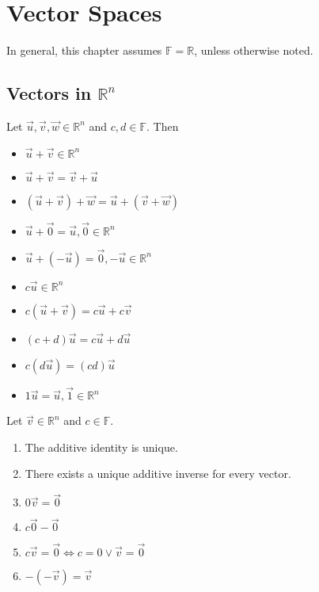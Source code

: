 \chapter{Vector Spaces}
In general, this chapter assumes \(\mathbb{F} =\mathbb{R} \), unless otherwise noted.
\section{Vectors in \(\mathbb{R} ^n\) }
\begin{definition}
    Let \(\vec{u},\vec{v} ,\vec{w}\in\mathbb{R} ^n\) and \(c,d\in\mathbb{F} \). Then 
    \begin{itemize}
        \item \(\vec{u} +\vec{v} \in\mathbb{R} ^n\) 
        \item \(\vec{u} +\vec{v} =\vec{v} +\vec{u} \)
        \item \((\vec{u} +\vec{v} )+\vec{w} =\vec{u} +(\vec{v} +\vec{w} )\)  
        \item \(\vec{u} +\vec{0}=\vec{u},\vec{0}\in\mathbb{R} ^n \) 
        \item \(\vec{u} +(-\vec{u} )=\vec{0},-\vec{u} \in\mathbb{R} ^n\)
        \item \(c \vec{u} \in\mathbb{R} ^n\)
        \item \(c(\vec{u} +\vec{v} )=c \vec{u} +c \vec{v} \)   
        \item \((c+d)\vec{u} =c \vec{u} +d \vec{u} \) 
        \item \(c(d \vec{u} )=(cd)\vec{u} \) 
        \item \(1 \vec{u} =\vec{u},\vec{1}\in\mathbb{R} ^n \) 
    \end{itemize}
\end{definition}
\begin{theorem}
Let \(\vec{v} \in\mathbb{R} ^n\) and \(c\in\mathbb{F} \).
\begin{enumerate}
\item The additive identity is unique.
\item There exists a unique additive inverse for every vector.
\item \(0\vec{v} =\vec{0}\)
\item \(c\vec{0}-\vec{0}\)
\item \(c \vec{v} =\vec{0}\Longleftrightarrow c=0 \lor \vec{v} =\vec{0}\) 
\item \(-(-\vec{v} )=\vec{v} \) 
    \end{enumerate}
\end{theorem}
